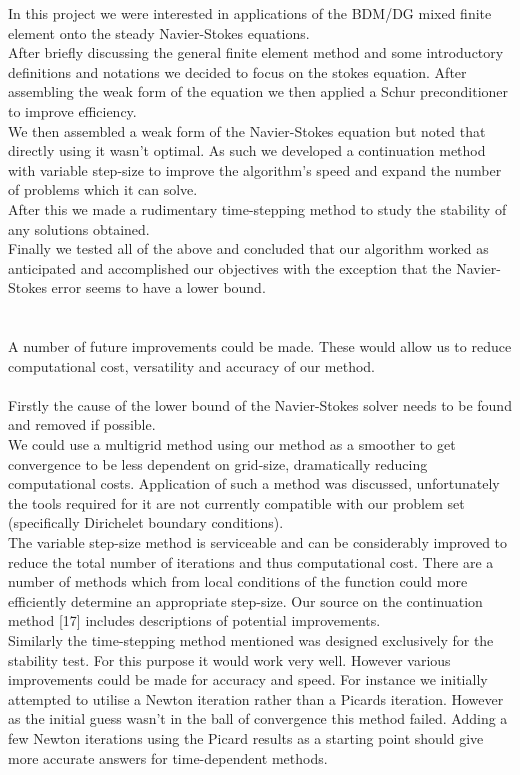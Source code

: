 \documentclass[11pt,twoside,a4paper]{article}
\begin{document}
In this project we were interested in applications of the BDM/DG mixed finite element onto the steady Navier-Stokes equations.\\
After briefly discussing the general finite element method and some introductory definitions and notations we decided to focus on the stokes equation. After assembling the weak form of the equation we then applied a Schur preconditioner to  improve efficiency.\\
We then assembled a weak form of the Navier-Stokes equation but noted that directly using it wasn't optimal. As such we developed a continuation method with variable step-size to improve the algorithm's speed and expand the number of problems which it can solve.\\
After this we made a rudimentary time-stepping method to study the stability of any solutions obtained.\\
Finally we tested all of the above and concluded that our algorithm worked as anticipated and accomplished our objectives with the exception that the Navier-Stokes error seems to have a lower bound.\\
\\
\\
A number of future improvements could be made.
These would allow us to reduce computational cost, versatility and accuracy of our method.\\
\\
Firstly the cause of the lower bound of the Navier-Stokes solver needs to be found and removed if possible.\\
We could use a multigrid method using our method as a smoother to get convergence to be less dependent on grid-size, dramatically reducing computational costs. Application of such a method was discussed, unfortunately the tools required for it are not currently compatible with our problem set (specifically Dirichelet boundary conditions).\\
The variable step-size method is serviceable and can be considerably improved to reduce the total number of iterations and thus computational cost. There are a number of methods which from local conditions of the function could more efficiently determine an appropriate step-size. Our source on the continuation method [17] includes descriptions of potential improvements.\\
Similarly the time-stepping method mentioned was designed exclusively for the stability test. For this purpose it would work very well. However various improvements could be made for accuracy and speed. For instance we initially attempted to utilise a Newton iteration rather than a Picards iteration. However as the initial guess wasn't in the ball of convergence this method failed. Adding a few Newton iterations using the Picard results as a starting point should give more accurate answers for time-dependent methods.\\
\end{document}
